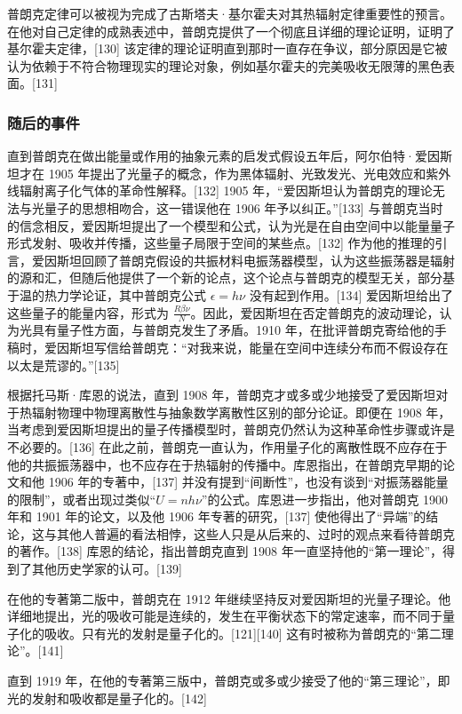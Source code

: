 普朗克定律可以被视为完成了古斯塔夫·基尔霍夫对其热辐射定律重要性的预言。在他对自己定律的成熟表述中，普朗克提供了一个彻底且详细的理论证明，证明了基尔霍夫定律，[130] 该定律的理论证明直到那时一直存在争议，部分原因是它被认为依赖于不符合物理现实的理论对象，例如基尔霍夫的完美吸收无限薄的黑色表面。[131]
\subsubsection{随后的事件}
直到普朗克在做出能量或作用的抽象元素的启发式假设五年后，阿尔伯特·爱因斯坦才在 1905 年提出了光量子的概念，作为黑体辐射、光致发光、光电效应和紫外线辐射离子化气体的革命性解释。[132] 1905 年，“爱因斯坦认为普朗克的理论无法与光量子的思想相吻合，这一错误他在 1906 年予以纠正。”[133] 与普朗克当时的信念相反，爱因斯坦提出了一个模型和公式，认为光是在自由空间中以能量量子形式发射、吸收并传播，这些量子局限于空间的某些点。[132] 作为他的推理的引言，爱因斯坦回顾了普朗克假设的共振材料电振荡器模型，认为这些振荡器是辐射的源和汇，但随后他提供了一个新的论点，这个论点与普朗克的模型无关，部分基于温的热力学论证，其中普朗克公式 \( \epsilon = h\nu \) 没有起到作用。[134] 爱因斯坦给出了这些量子的能量内容，形式为 \( \frac{R\beta \nu}{N} \)。因此，爱因斯坦在否定普朗克的波动理论，认为光具有量子性方面，与普朗克发生了矛盾。1910 年，在批评普朗克寄给他的手稿时，爱因斯坦写信给普朗克：“对我来说，能量在空间中连续分布而不假设存在以太是荒谬的。”[135]

根据托马斯·库恩的说法，直到 1908 年，普朗克才或多或少地接受了爱因斯坦对于热辐射物理中物理离散性与抽象数学离散性区别的部分论证。即便在 1908 年，当考虑到爱因斯坦提出的量子传播模型时，普朗克仍然认为这种革命性步骤或许是不必要的。[136] 在此之前，普朗克一直认为，作用量子化的离散性既不应存在于他的共振振荡器中，也不应存在于热辐射的传播中。库恩指出，在普朗克早期的论文和他 1906 年的专著中，[137] 并没有提到“间断性”，也没有谈到“对振荡器能量的限制”，或者出现过类似“\( U = nh\nu \)”的公式。库恩进一步指出，他对普朗克 1900 年和 1901 年的论文，以及他 1906 年专著的研究，[137] 使他得出了“异端”的结论，这与其他人普遍的看法相悖，这些人只是从后来的、过时的观点来看待普朗克的著作。[138] 库恩的结论，指出普朗克直到 1908 年一直坚持他的“第一理论”，得到了其他历史学家的认可。[139]

在他的专著第二版中，普朗克在 1912 年继续坚持反对爱因斯坦的光量子理论。他详细地提出，光的吸收可能是连续的，发生在平衡状态下的常定速率，而不同于量子化的吸收。只有光的发射是量子化的。[121][140] 这有时被称为普朗克的“第二理论”。[141]

直到 1919 年，在他的专著第三版中，普朗克或多或少接受了他的“第三理论”，即光的发射和吸收都是量子化的。[142]

